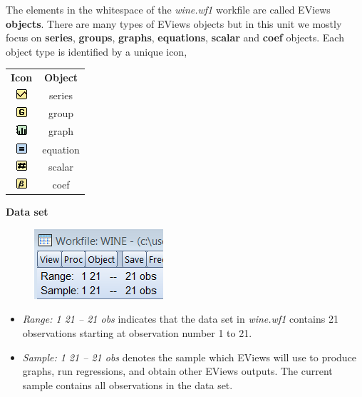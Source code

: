 \documentclass[12pt]{report}
\begin{document}
		\noindent The elements in the whitespace of the \textit{wine.wf1} workfile are called EViews \textbf{objects}. There are many types of EViews objects but in this unit we mostly focus on \textbf{series}, \textbf{groups}, \textbf{graphs}, \textbf{equations}, \textbf{scalar} and \textbf{coef} objects. Each object type is identified by a unique icon,
		\vspace{-\baselineskip}
		\begin{center}
			\begin{tabular}{ c c}
				\textbf{Icon} & \textbf{Object} \\
				\includegraphics{series} & series \\
				\includegraphics{group} & group \\
				\includegraphics{graph} & graph \\
				\includegraphics{equation} & equation \\
				\includegraphics{scalar} & scalar \\
				\includegraphics{coef} & coef \\
			\end{tabular}
		\end{center}
		\vspace{-\baselineskip}
		\newpage	
		\noindent \textbf{Data set}
		\begin{figure}[H]
			\centering
			\includegraphics{dataset1}
		\end{figure}
		\vspace{-\baselineskip}
		\begin{itemize}
			\item \textit{Range: 1 21 -- 21 obs} indicates that the data set in \textit{wine.wf1} contains 21 observations starting at observation number 1 to 21.
			\item \textit{Sample: 1 21 -- 21 obs} denotes the sample which EViews will use to produce graphs, run regressions, and obtain other EViews outputs. The current sample contains all observations in the data set.
		\end{itemize}
\end{document}
